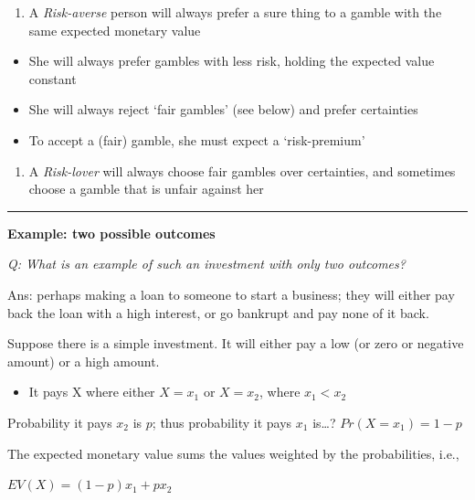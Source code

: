 \documentclass[]{article}
\providecommand{\tightlist}{%
  \setlength{\itemsep}{0pt}\setlength{\parskip}{0pt}}
\begin{document}
\begin{enumerate}
\def\labelenumi{\arabic{enumi}.}
\setcounter{enumi}{1}
\tightlist
\item
  A \emph{Risk-averse} person will always prefer a sure thing to a gamble with the same expected monetary value
\end{enumerate}

\begin{itemize}
\tightlist
\item
  She will always prefer gambles with less risk, holding the expected value constant
\item
  She will always reject `fair gambles' (see below) and prefer certainties
\item
  To accept a (fair) gamble, she must expect a `risk-premium'
\end{itemize}

\begin{enumerate}
\def\labelenumi{\arabic{enumi}.}
\setcounter{enumi}{2}
\tightlist
\item
  A \emph{Risk-lover} will always choose fair gambles over certainties, and sometimes choose a gamble that is unfair against her
\end{enumerate}

\begin{center}\rule{0.5\linewidth}{\linethickness}\end{center}

\textbf{Example: two possible outcomes}

\emph{Q: What is an example of such an investment with only two outcomes?}

Ans: perhaps making a loan to someone to start a business; they will either pay back the loan with a high interest, or go bankrupt and pay none of it back.

Suppose there is a simple investment.
It will either pay a low (or zero or negative amount) or a high amount.

\begin{itemize}
\tightlist
\item
  It pays X where either \(X =x_1\) or \(X=x_2\), where \(x_1<x_2\)
\end{itemize}

Probability it pays \(x_2\) is \(p\); thus probability it pays \(x_1\) is\ldots{}?
\(Pr(X=x_1)= 1-p\)

The expected monetary value sums the values weighted by the probabilities, i.e.,

\(EV(X)=(1-p) x_1 + p x_2\)
\end{document}
